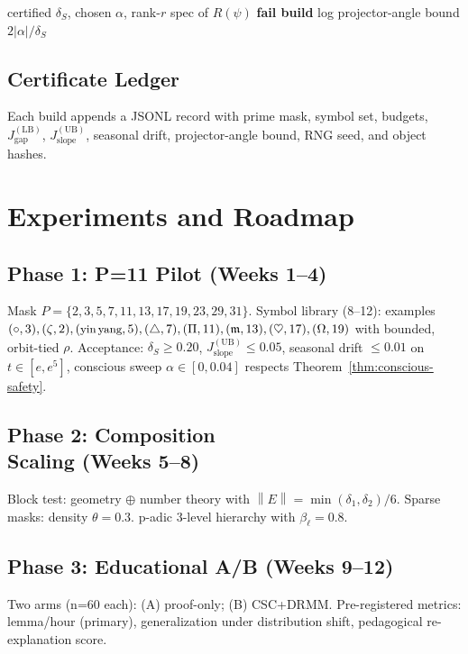 \documentclass[11pt]{article}
\theoremstyle{plain}
\theoremstyle{definition}
\newcommand{\norm}[1]{\left\lVert #1 \right\rVert}
\newcommand{\LB}{\mathrm{LB}}
\newcommand{\UB}{\mathrm{UB}}
\newcommand{\Jgap}{J^{(\LB)}_{\text{gap}}}
\newcommand{\Jslope}{J^{(\UB)}_{\text{slope}}}
\begin{document}
\begin{algorithm}[H]
\caption{Conscious Coupling Safety Check}
\begin{algorithmic}[1]
\Require certified $\delta_S$, chosen $\alpha$, rank-$r$ spec of $R(\psi)$
\If{$|\alpha|\ge \delta_S/4$ or $\norm{R(\psi)}>1$}
  \State \textbf{fail build}
\Else
  \State log projector-angle bound $2|\alpha|/\delta_S$
\EndIf
\end{algorithmic}
\end{algorithm}

\subsection{Certificate Ledger}
Each build appends a JSONL record with prime mask, symbol set, budgets, $\Jgap$, $\Jslope$, seasonal drift, projector-angle bound, RNG seed, and object hashes.

\section{Experiments and Roadmap}\label{sec:experiments}
\subsection{Phase 1: P=11 Pilot (Weeks 1--4)}
Mask \(P=\{2,3,5,7,11,13,17,19,23,29,31\}\). Symbol library (8--12): examples \((\circ,3), (\zeta,2), (\text{\small yin\,yang},5), (\triangle,7), (\Pi,11), (\mathfrak{m},13), (\heartsuit,17), (\Omega,19)\) with bounded, orbit-tied \(\rho\). Acceptance: \(\delta_S\ge0.20\), \(\Jslope\le0.05\), seasonal drift \(\le0.01\) on $t\in[e,e^5]$, conscious sweep $\alpha\in[0,0.04]$ respects Theorem~\ref{thm:conscious-safety}.

\subsection{Phase 2: Composition \\ Scaling (Weeks 5--8)}
Block test: geometry $\oplus$ number theory with $\norm{E}=\min(\delta_1,\delta_2)/6$. Sparse masks: density $\theta=0.3$. p-adic 3-level hierarchy with $\beta_\ell=0.8$.

\subsection{Phase 3: Educational A/B (Weeks 9--12)}
Two arms (n=60 each): (A) proof-only; (B) CSC+DRMM. Pre-registered metrics: lemma/hour (primary), generalization under distribution shift, pedagogical re-explanation score.
\end{document}
